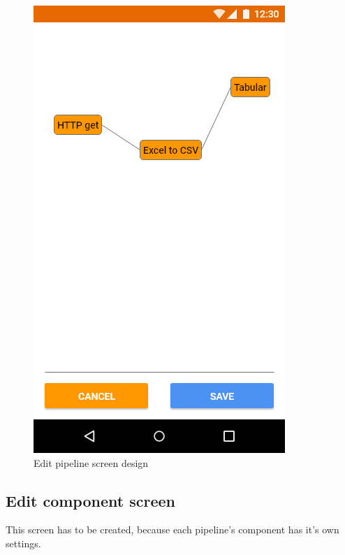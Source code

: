 \begin{figure}
\begin{minipage}[b]{0.32\textwidth}
    	\includegraphics[width=\textwidth]{pics/xd/Pipeline editor.png}
    	\caption[Edit pipeline screen]{Edit pipeline screen design}\label{fig:xdPipelineEditor}
    \end{minipage}
\end{figure}

\subsection{Edit component screen}
This screen has to be created, because each pipeline's component has it's own settings.

